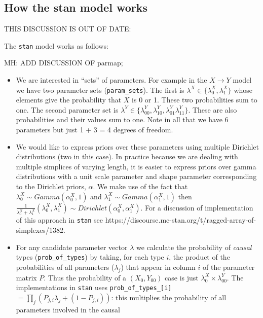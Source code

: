 \documentclass[
  11pt,
  article]{jss}
\begin{document}
\hypertarget{how-the-stan-model-works}{%
\subsection{How the stan model works}\label{how-the-stan-model-works}}

THIS DISCUSSION IS OUT OF DATE:

The \texttt{stan} model works as follows:

MH: ADD DISCUSSION OF parmap;

\begin{itemize}
\item
  We are interested in ``sets'' of parameters. For example in the
  \(X \rightarrow Y\) model we have two parameter sets
  (\texttt{param\_sets}). The first is
  \(\lambda^X \in \{\lambda^X_0, \lambda^X_1\}\) whose elements give the
  probability that \(X\) is 0 or 1. These two probabilities sum to one.
  The second parameter set is
  \(\lambda^Y \in \{\lambda^Y_{00}, \lambda^Y_{10}, \lambda^Y_{01} \lambda^Y_{11}\}\).
  These are also probabilities and their values sum to one. Note in all
  that we have 6 parameters but just 1 + 3 = 4 degrees of freedom.
\item
  We would like to express priors over these parameters using multiple
  Dirichlet distributions (two in this case). In practice because we are
  dealing with multiple simplices of varying length, it is easier to
  express priors over gamma distributions with a unit scale parameter
  and shape parameter corresponding to the Dirichlet priors, \(\alpha\).
  We make use of the fact that \(\lambda^X_0 \sim Gamma(\alpha^X_0,1)\)
  and \(\lambda^X_1 \sim Gamma(\alpha^X_1,1)\) then
  \(\frac{1}{\lambda^X_0 +\lambda^X_1}(\lambda^X_0, \lambda^X_1) \sim Dirichlet(\alpha^X_0, \alpha^X_1)\).
  For a discussion of implementation of this approach in \texttt{stan}
  see https://discourse.mc-stan.org/t/ragged-array-of-simplexes/1382.
\item
  For any candidate parameter vector \(\lambda\) we calculate the
  probability of \emph{causal} types (\texttt{prob\_of\_types}) by
  taking, for each type \(i\), the product of the probabilities of all
  parameters (\(\lambda_j\)) that appear in column \(i\) of the
  parameter matrix \(P\). Thus the probability of a \((X_0,Y_{00})\)
  case is just \(\lambda^X_0 \times \lambda^Y_{00}\). The
  implementations in \texttt{stan} uses
  \texttt{prob\_of\_types\_{[}i{]}}
  \(= \prod_j \left(P_{j,i} \lambda_j + (1-P_{j,i})\right)\): this
  multiplies the probability of all parameters involved in the causal

\end{itemize}
\end{document}
